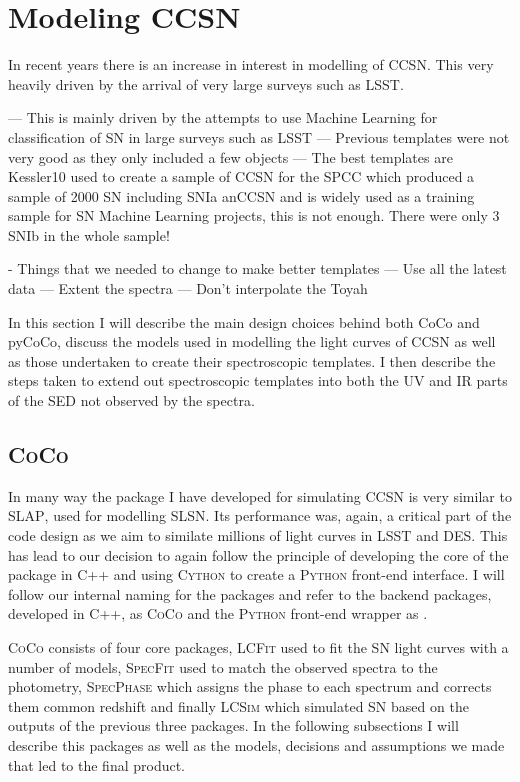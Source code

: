 \section{Modeling CCSN}
In recent years there is an increase in interest in modelling of CCSN. This very heavily driven by the arrival of very large surveys such as LSST.

--- This is mainly driven by the attempts to use Machine Learning for classification of SN in large surveys such as LSST
--- Previous templates were not very good as they only included a few objects
--- The best templates are Kessler10 used to create a sample of CCSN for the SPCC which produced a sample of 2000 SN including SNIa anCCSN and is widely used as a training sample for SN Machine Learning projects, this is not enough. There were only 3 SNIb in the whole sample!

- Things that we needed to change to make better templates
--- Use all the latest data
--- Extent the spectra
--- Don't interpolate the Toyah

In this section I will describe the main design choices behind both CoCo and pyCoCo, discuss the models used in modelling the light curves of CCSN as well as those undertaken to create their spectroscopic templates. I then describe the steps taken to extend out spectroscopic templates into both the UV and IR parts of the SED not observed by the spectra.

\subsection{\textsc{CoCo}}
In many way the package I have developed for simulating CCSN is very similar to \textsc{SLAP}, used for modelling SLSN. Its performance was, again, a critical part of the code design as we aim to similate millions of light curves in LSST and DES. This has lead to our decision to again follow the principle of developing the core of the package in \textsc{C++} and using \textsc{Cython} to create a \textsc{Python} front-end interface. I will follow our internal naming for the packages and refer to the backend packages, developed in \textsc{C++}, as \textsc{CoCo} and the \textsc{Python} front-end wrapper as .

\textsc{CoCo} consists of four core packages, \textsc{LCFit} used to fit the SN light curves with a number of models, \textsc{SpecFit} used to match the observed spectra to the photometry, \textsc{SpecPhase} which assigns the phase to each spectrum and corrects them common redshift and finally \textsc{LCSim} which simulated SN based on the outputs of the previous three packages. In the following subsections I will describe this packages as well as the models, decisions and assumptions we made that led to the final product.

